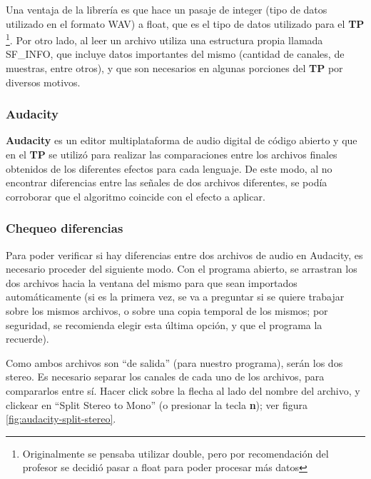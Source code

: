 \documentclass[a4paper,spanish,12pt]{article}
\begin{document}
Una ventaja de la librería es que hace un pasaje de integer (tipo de datos utilizado en el formato WAV) a float, que es el tipo de datos utilizado para el \textbf{TP} \footnote{Originalmente se pensaba utilizar double, pero por recomendación del profesor se decidió pasar a float para poder procesar más datos}. Por otro lado, al leer un archivo utiliza una estructura propia llamada SF\_INFO, que incluye datos importantes del mismo (cantidad de canales, de muestras, entre otros), y que son necesarios en algunas porciones del \textbf{TP} por diversos motivos.

\subsubsection{Audacity}
\label{subsec:audacity}
\textbf{Audacity} es un editor multiplataforma de audio digital de código abierto y que en el \textbf{TP} se utilizó para realizar las comparaciones entre los archivos finales obtenidos de los diferentes efectos para cada lenguaje. De este modo, al no encontrar diferencias entre las señales de dos archivos diferentes, se podía corroborar que el algoritmo coincide con el efecto a aplicar.

\subsubsection*{Chequeo diferencias}
\label{subsec:chequeo-diferencias}
Para poder verificar si hay diferencias entre dos archivos de audio en Audacity, es necesario proceder del siguiente modo. Con el programa abierto, se arrastran los dos archivos hacia la ventana del mismo para que sean importados automáticamente (si es la primera vez, se va a preguntar si se quiere trabajar sobre los mismos archivos, o sobre una copia temporal de los mismos; por seguridad, se recomienda elegir esta última opción, y que el programa la recuerde).\vspace{\baselineskip}

Como ambos archivos son ``de salida'' (para nuestro programa), serán los dos stereo. Es necesario separar los canales de cada uno de los archivos, para compararlos entre sí. Hacer click sobre la flecha al lado del nombre del archivo, y clickear en ``Split Stereo to Mono'' (o presionar la tecla \textbf{n}); ver figura \ref{fig:audacity-split-stereo}.
\end{document}
